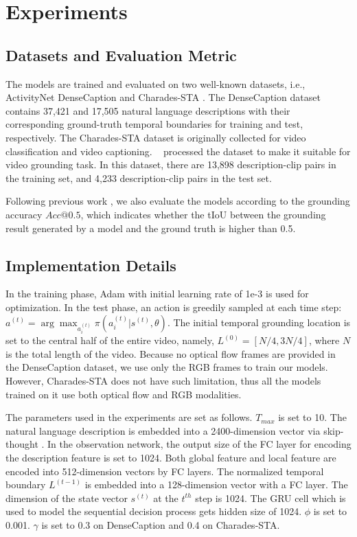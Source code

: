 \documentclass[letterpaper]{article} %
\begin{document}
\section{Experiments}
\subsection{Datasets and Evaluation Metric}
The models are trained and evaluated on two well-known datasets, i.e., ActivityNet DenseCaption \cite{densecaption} and Charades-STA \cite{charades,tall}. The DenseCaption dataset contains 37,421 and 17,505 natural language descriptions with their corresponding ground-truth temporal boundaries for training and test, respectively.
The Charades-STA dataset is originally collected for video classification and video captioning. \citeauthor{tall}~ processed the dataset to make it suitable for video grounding task. In this dataset, there are 13,898 description-clip pairs in the training set, and 4,233 description-clip pairs in the test set.

Following previous work \cite{lifeifei_loc,tall}, we also evaluate the models according to the grounding accuracy $Acc@0.5$, which indicates whether the tIoU between the grounding result generated by a model and the ground truth is higher than 0.5.

\subsection{Implementation Details}
In the training phase, Adam with initial learning rate of 1e-3 is used for optimization. In the test phase, an action is greedily sampled at each time step: $a^{(t)} = \arg\max_{a_i^{(t)}}\pi(a_i^{(t)}|s^{(t)}, \theta)$. The initial temporal grounding location is set to the central half of the entire video, namely, $L^{(0)} = [N/4, 3N/4]$, where $N$ is the total length of the video. Because no optical flow frames are provided in the DenseCaption dataset, we use only the RGB frames to train our models. However, Charades-STA does not have such limitation, thus all the models trained on it use both optical flow and RGB modalities.

The parameters used in the experiments are set as follows. $T_{max}$ is set to 10. The natural language description is embedded into a 2400-dimension vector via skip-thought \cite{skipthought}. In the observation network, the output size of the FC layer for encoding the description feature is set to 1024. Both global feature and local feature are encoded into 512-dimension vectors by FC layers. The normalized temporal boundary $L^{(t-1)}$ is embedded into a 128-dimension vector with a FC layer. The dimension of the state vector $s^{(t)}$ at the $t^{th}$ step is 1024. The GRU cell which is used to model the sequential decision process gets hidden size of 1024. $\phi$ is set to 0.001. $\gamma$ is set to 0.3 on DenseCaption and 0.4 on Charades-STA.
\end{document}
